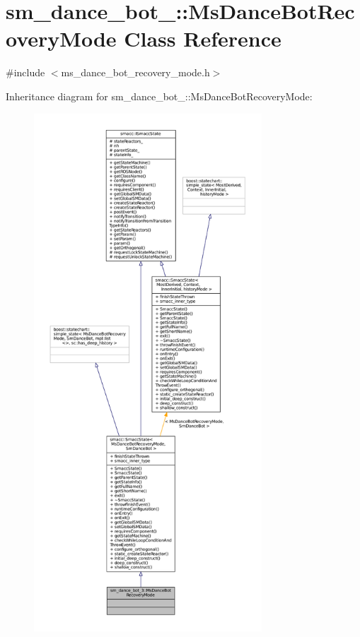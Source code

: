 \hypertarget{classsm__dance__bot__3_1_1MsDanceBotRecoveryMode}{}\section{sm\+\_\+dance\+\_\+bot\+\_\+:\+:Ms\+Dance\+Bot\+Recovery\+Mode Class Reference}
\label{classsm__dance__bot__3_1_1MsDanceBotRecoveryMode}


{\ttfamily \#include $<$ms\+\_\+dance\+\_\+bot\+\_\+recovery\+\_\+mode.\+h$>$}



Inheritance diagram for sm\+\_\+dance\+\_\+bot\+\_\+:\+:Ms\+Dance\+Bot\+Recovery\+Mode\+:
\nopagebreak
\begin{figure}[H]
\begin{center}
\leavevmode
\includegraphics[height=550pt]{classsm__dance__bot__3_1_1MsDanceBotRecoveryMode__inherit__graph}
\end{center}
\end{figure}


